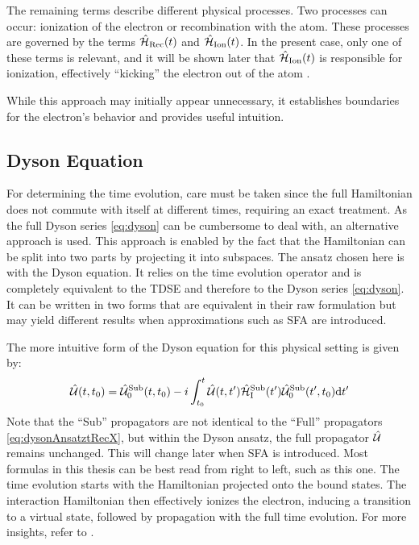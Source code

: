 The remaining terms describe different physical processes.
Two processes can occur: ionization of the electron or recombination with the atom.
These processes are governed by the terms $\hat{\mathcal{H}}_{\mathrm{Rec}}(t)$ and $\hat{\mathcal{H}}_{\mathrm{Ion}}(t)$.
In the present case, only one of these terms is relevant, and it will be shown later that $\hat{\mathcal{H}}_{\mathrm{Ion}}(t)$ is responsible for ionization, effectively ``kicking'' the electron out of the atom \cite{Ivanov20012005}.

While this approach may initially appear unnecessary, it establishes boundaries for the electron's behavior and provides useful intuition.










\subsection{Dyson Equation}
For determining the time evolution, care must be taken since the full Hamiltonian does not commute with itself at different times, requiring an exact treatment.
As the full Dyson series \eqref{eq:dyson} can be cumbersome to deal with, an alternative approach is used.
This approach is enabled by the fact that the Hamiltonian can be split into two parts by projecting it into subspaces.
The ansatz chosen here is with the Dyson equation.
It relies on the time evolution operator and is completely equivalent to the TDSE and therefore to the Dyson series \eqref{eq:dyson}.
It can be written in two forms that are equivalent in their raw formulation but may yield different results when approximations such as SFA are introduced.\

The more intuitive form of the Dyson equation for this physical setting is given by:
\begin{equation}
    \hat{\mathcal{U}}(t,t_0)=\hat{\mathcal{U}}^{\mathrm{Sub}}_0(t,t_0)-i\int_{t_0}^{t} \hat{\mathcal{U}}(t,t')\hat{\mathcal{H}}^{\mathrm{Sub}}_{\mathrm{I}}(t')\hat{\mathcal{U}}^{\mathrm{Sub}}_0(t',t_0) \mathrm{d} t'       \label{eq:dysonAnsatzODE}
\end{equation}
Note that the ``Sub'' propagators are not identical to the ``Full'' propagators \eqref{eq:dysonAnsatztRecX}, but within the Dyson ansatz, the full propagator $\hat{\mathcal{U}}$ remains unchanged.
This will change later when SFA is introduced.
Most formulas in this thesis can be best read from right to left, such as this one.
The time evolution starts with the Hamiltonian projected onto the bound states.
The interaction Hamiltonian then effectively ionizes the electron, inducing a transition to a virtual state, followed by propagation with the full time evolution. 
For more insights, refer to \cite{Ivanov20012005}.

